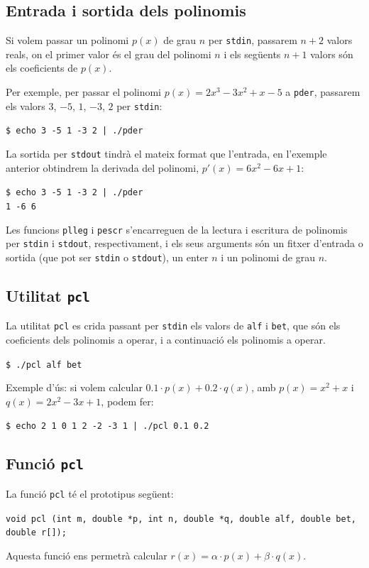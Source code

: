 \documentclass[12pt,twoside,a4paper]{article}
\newcommand{\bash}[1]{\begin{tcolorbox}\texttt{\$ #1}\end{tcolorbox}}
\newcommand{\fn}[2]{\begin{tcolorbox}[enhanced,colback=white,colframe=gray!50!white,attach boxed title to top center={yshift=-3mm,yshifttext=-1mm},title={Funció \texttt{#1}},boxed title style={size=small,colframe=black},colbacktitle=white,coltitle=black]\texttt{#2}\end{tcolorbox}}
\begin{document}
\subsection{Entrada i sortida dels polinomis}
Si volem passar un polinomi $p(x)$ de grau $n$ per \texttt{stdin}, passarem $n+2$ valors reals, on el primer valor és el grau del polinomi $n$ i els següents $n+1$ valors són els coeficients de $p(x)$.

Per exemple, per passar el polinomi $p(x) = 2x^3 - 3x^2 + x - 5$ a \texttt{pder}, passarem els valors $3$, $-5$, $1$, $-3$, $2$ per \texttt{stdin}:

\bash{echo 3 -5 1 -3 2 | ./pder}

La sortida per \texttt{stdout} tindrà el mateix format que l'entrada, en l'exemple anterior obtindrem la derivada del polinomi, $p'(x) = 6x^2 - 6x + 1$:

\bash{echo 3 -5 1 -3 2 | ./pder\\1 -6 6}

Les funcions \texttt{plleg} i \texttt{pescr} s'encarreguen de la lectura i escritura de polinomis per \texttt{stdin} i \texttt{stdout}, respectivament, i els seus arguments són un fitxer d'entrada o sortida (que pot ser \texttt{stdin} o \texttt{stdout}), un enter $n$ i un polinomi de grau $n$.

\newpage

\subsection{Utilitat \texttt{pcl}}
La utilitat \texttt{pcl} es crida passant per \texttt{stdin} els valors de \texttt{alf} i \texttt{bet}, que són els coeficients dels polinomis a operar, i a continuació els polinomis a operar.
\bash{./pcl alf bet}

Exemple d'ús: si volem calcular $0.1 \cdot p(x) + 0.2 \cdot q(x)$, amb $p(x) = x^2 + x$ i $q(x) = 2x^2 - 3x + 1$, podem fer:

\bash{echo 2 1 0 1 2 -2 -3 1 | ./pcl 0.1 0.2}

\subsection{Funció \texttt{pcl}}
La funció \texttt{pcl} té el prototipus següent:

\fn{pcl}{void pcl (int m, double *p, int n, double *q, double alf, double bet, double r[]);}

Aquesta funció ens permetrà calcular $r(x) = \alpha \cdot p(x) + \beta \cdot q(x)$.
\end{document}
